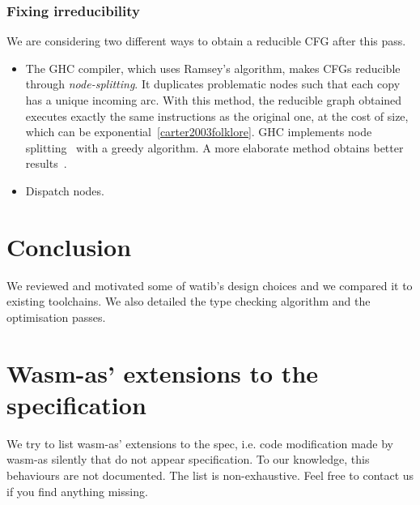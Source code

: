 \documentclass[a4paper,11pt]{article}
\begin{document}
\subsubsection{Fixing irreducibility}
We are considering two different ways to obtain a reducible CFG after this pass.
\begin{itemize}
  \item The GHC compiler, which uses Ramsey's algorithm, makes CFGs reducible
    through \emph{node-splitting}. It duplicates problematic nodes such that
    each copy has a unique incoming arc. With this method, the reducible graph
    obtained executes exactly the same instructions as the original one, at the
    cost of size, which can be exponential~\ref{carter2003folklore}. GHC
    implements node splitting~\cite[Appendix~A]{ramsey2022beyond} with a greedy
    algorithm. A more elaborate method obtains better results~\cite{janssen1997making}.
  \item Dispatch nodes.
\end{itemize}


\section{Conclusion}
We reviewed and motivated some of \textsf{watib}'s design choices and we
compared it to existing toolchains. We also detailed the type checking algorithm
and the optimisation passes.

\printbibliography
\newpage
\appendix
\section{Wasm-as' extensions to the specification}\label{wasmasex}
We try to list wasm-as' extensions to the spec, i.e. code modification made by
wasm-as silently that do not appear specification. To our knowledge, this
behaviours are not documented. The list is non-exhaustive. Feel free to contact
us if you find anything missing.
\end{document}

